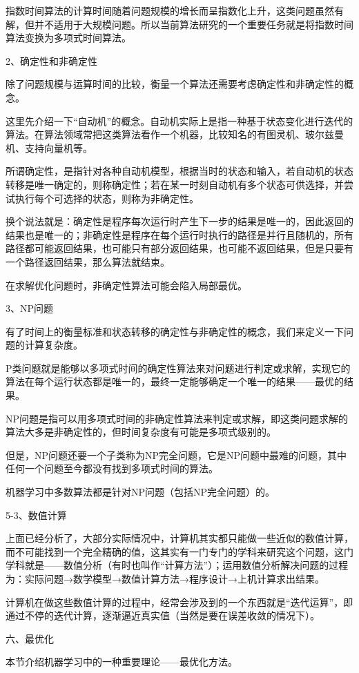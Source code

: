 \documentclass[11pt]{book}
\newcounter{#2}
\newcounter{#2}[#1]
\numberwithin{#2}{#1}
\begin{document}
指数时间算法的计算时间随着问题规模的增长而呈指数化上升，这类问题虽然有解，但并不适用于大规模问题。所以当前算法研究的一个重要任务就是将指数时间算法变换为多项式时间算法。

2、确定性和非确定性 

除了问题规模与运算时间的比较，衡量一个算法还需要考虑确定性和非确定性的概念。

这里先介绍一下“自动机”的概念。自动机实际上是指一种基于状态变化进行迭代的算法。在算法领域常把这类算法看作一个机器，比较知名的有图灵机、玻尔兹曼机、支持向量机等。

所谓确定性，是指针对各种自动机模型，根据当时的状态和输入，若自动机的状态转移是唯一确定的，则称确定性；若在某一时刻自动机有多个状态可供选择，并尝试执行每个可选择的状态，则称为非确定性。

换个说法就是：确定性是程序每次运行时产生下一步的结果是唯一的，因此返回的结果也是唯一的；非确定性是程序在每个运行时执行的路径是并行且随机的，所有路径都可能返回结果，也可能只有部分返回结果，也可能不返回结果，但是只要有一个路径返回结果，那么算法就结束。

在求解优化问题时，非确定性算法可能会陷入局部最优。

3、NP问题

有了时间上的衡量标准和状态转移的确定性与非确定性的概念，我们来定义一下问题的计算复杂度。

P类问题就是能够以多项式时间的确定性算法来对问题进行判定或求解，实现它的算法在每个运行状态都是唯一的，最终一定能够确定一个唯一的结果——最优的结果。

NP问题是指可以用多项式时间的非确定性算法来判定或求解，即这类问题求解的算法大多是非确定性的，但时间复杂度有可能是多项式级别的。

但是，NP问题还要一个子类称为NP完全问题，它是NP问题中最难的问题，其中任何一个问题至今都没有找到多项式时间的算法。

机器学习中多数算法都是针对NP问题（包括NP完全问题）的。

5-3、数值计算

上面已经分析了，大部分实际情况中，计算机其实都只能做一些近似的数值计算，而不可能找到一个完全精确的值，这其实有一门专门的学科来研究这个问题，这门学科就是——数值分析（有时也叫作“计算方法”）；运用数值分析解决问题的过程为：实际问题→数学模型→数值计算方法→程序设计→上机计算求出结果。

计算机在做这些数值计算的过程中，经常会涉及到的一个东西就是“迭代运算”，即通过不停的迭代计算，逐渐逼近真实值（当然是要在误差收敛的情况下）。

六、最优化

本节介绍机器学习中的一种重要理论——最优化方法。
\end{document}
